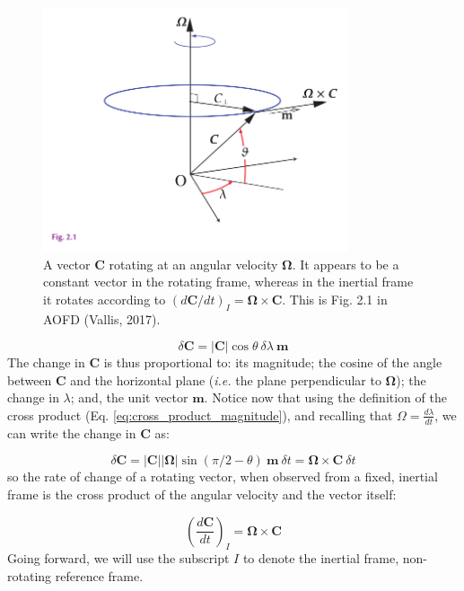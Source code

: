 \documentclass[12pt]{article}
\numberwithin{equation}{section}
\numberwithin{figure}{section}
\numberwithin{table}{section}
\begin{document}
\begin{figure}[h]
  \centering
  \includegraphics[width=0.8\textwidth]{assets/fig_rotating_vector.pdf}
  \caption{
    A vector $\mathbf{C}$ rotating at an angular velocity $\mathbf{\Omega}$.
    It appears to be a constant vector in the rotating frame, whereas in the
    inertial frame it rotates according to
    $\left(d\mathbf{C}/dt\right)_I = \mathbf{\Omega} \times \mathbf{C}$.
    This is Fig. 2.1 in AOFD (Vallis, 2017).
  }
  \label{fig:rotating_vector}
\end{figure}

\begin{equation}
  \delta \mathbf{C} = |\mathbf{C}| \cos\theta\ \delta \lambda\ \mathbf{m}
\end{equation}
The change in $\mathbf{C}$ is thus proportional to:
its magnitude;
the cosine of the angle between $\mathbf{C}$ and the horizontal plane
(\textit{i.e.} the plane perpendicular to $\mathbf{\Omega}$);
the change in $\lambda$;
and, the unit vector $\mathbf{m}$.
Notice now that using the definition of the cross product (Eq. \ref{eq:cross_product_magnitude}),
and recalling that $\Omega = \frac{d\lambda}{dt}$,
we can write the change in $\mathbf{C}$ as:

\begin{equation}
  \delta \mathbf{C} = |\mathbf{C}| |\mathbf{\Omega}| \sin(\pi/2 - \theta)\ \mathbf{m}\ \delta t =
  \mathbf{\Omega} \times \mathbf{C}\ \delta t
\end{equation}
so the rate of change of a rotating vector, when observed from a fixed, inertial
frame is the cross product of the angular velocity and the vector itself:

\begin{equation}
  \left(\frac{d\mathbf{C}}{dt}\right)_I = \mathbf{\Omega} \times \mathbf{C}
\end{equation}
Going forward, we will use the subscript $I$ to denote the inertial frame,
non-rotating reference frame.
\end{document}
